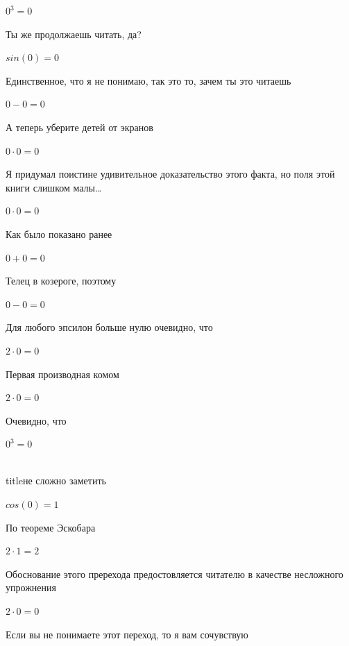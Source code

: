 \documentclass[12pt,a4paper,fleqn]{article}
\begin{document}
\begin{center}$0^{3} = 0$\end{center}
Ты же продолжаешь читать, да?

\begin{center}$sin(0) = 0$\end{center}
Единственное, что я не понимаю, так это то, зачем ты это читаешь

\begin{center}$0-0 = 0$\end{center}
А теперь уберите детей от экранов

\begin{center}$0 \cdot 0 = 0$\end{center}
Я придумал поистине удивительное доказательство этого факта, но поля этой книги слишком малы\ldots

\begin{center}$0 \cdot 0 = 0$\end{center}
Как было показано ранее

\begin{center}$0+0 = 0$\end{center}
Телец в козероге, поэтому

\begin{center}$0-0 = 0$\end{center}
Для любого эпсилон больше нулю очевидно, что

\begin{center}$2 \cdot 0 = 0$\end{center}
Первая производная комом\cite{link2}

\begin{center}$2 \cdot 0 = 0$\end{center}
Очевидно, что

\begin{center}$0^{3} = 0$\end{center}
\\ title{не сложно заметить} 

\begin{center}$cos(0) = 1$\end{center}
По теореме Эскобара

\begin{center}$2 \cdot 1 = 2$\end{center}
Обоснование этого пререхода предостовляется читателю в качестве несложного упрожнения

\begin{center}$2 \cdot 0 = 0$\end{center}
Если вы не понимаете этот переход, то я вам сочувствую
\end{document}
